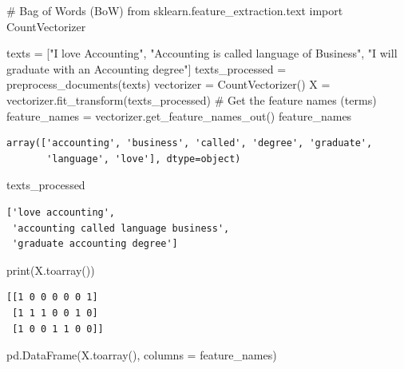 \documentclass[
  letterpaper,
  DIV=11,
  numbers=noendperiod]{scrreprt}
\newenvironment{Shaded}{\begin{snugshade}}{\end{snugshade}}
\newcommand{\BuiltInTok}[1]{\textcolor[rgb]{0.00,0.23,0.31}{#1}}
\newcommand{\CommentTok}[1]{\textcolor[rgb]{0.37,0.37,0.37}{#1}}
\newcommand{\ImportTok}[1]{\textcolor[rgb]{0.00,0.46,0.62}{#1}}
\newcommand{\NormalTok}[1]{\textcolor[rgb]{0.00,0.23,0.31}{#1}}
\newcommand{\OperatorTok}[1]{\textcolor[rgb]{0.37,0.37,0.37}{#1}}
\newcommand{\StringTok}[1]{\textcolor[rgb]{0.13,0.47,0.30}{#1}}
\begin{document}
\begin{Shaded}
\begin{Highlighting}[]
\CommentTok{\# Bag of Words (BoW)}
\ImportTok{from}\NormalTok{ sklearn.feature\_extraction.text }\ImportTok{import}\NormalTok{ CountVectorizer}

\NormalTok{texts }\OperatorTok{=}\NormalTok{ [}\StringTok{"I love Accounting"}\NormalTok{, }\StringTok{"Accounting is called language of Business"}\NormalTok{, }\StringTok{"I will graduate with an Accounting degree"}\NormalTok{]}
\NormalTok{texts\_processed }\OperatorTok{=}\NormalTok{ preprocess\_documents(texts)}
\NormalTok{vectorizer }\OperatorTok{=}\NormalTok{ CountVectorizer()}
\NormalTok{X }\OperatorTok{=}\NormalTok{ vectorizer.fit\_transform(texts\_processed)}
\CommentTok{\# Get the feature names (terms) }
\NormalTok{feature\_names }\OperatorTok{=}\NormalTok{ vectorizer.get\_feature\_names\_out()}
\NormalTok{feature\_names}
\end{Highlighting}
\end{Shaded}

\begin{verbatim}
array(['accounting', 'business', 'called', 'degree', 'graduate',
       'language', 'love'], dtype=object)
\end{verbatim}

\begin{Shaded}
\begin{Highlighting}[]
\NormalTok{texts\_processed}
\end{Highlighting}
\end{Shaded}

\begin{verbatim}
['love accounting',
 'accounting called language business',
 'graduate accounting degree']
\end{verbatim}

\begin{Shaded}
\begin{Highlighting}[]
\BuiltInTok{print}\NormalTok{(X.toarray())}
\end{Highlighting}
\end{Shaded}

\begin{verbatim}
[[1 0 0 0 0 0 1]
 [1 1 1 0 0 1 0]
 [1 0 0 1 1 0 0]]
\end{verbatim}

\begin{Shaded}
\begin{Highlighting}[]
\NormalTok{pd.DataFrame(X.toarray(), columns }\OperatorTok{=}\NormalTok{ feature\_names)}
\end{Highlighting}
\end{Shaded}
\end{document}
